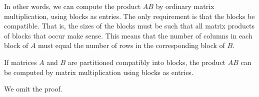 \documentclass{ximera}
\begin{document}
In other words, we can compute the product $AB$ by ordinary matrix multiplication, using blocks as entries. The only requirement is that the blocks be compatible. That is, the sizes of the blocks must be such that all matrix products of blocks that occur make sense. This means that the number of columns in each block of $A$ must equal the number of rows in the corresponding block of $B$.


\begin{theorem}\label{th:blockmatmult}
If matrices $A$ and $B$ are partitioned compatibly into blocks, the product $AB$ can be computed by matrix multiplication using blocks as entries.
\end{theorem}
We omit the proof.

\end{document}
